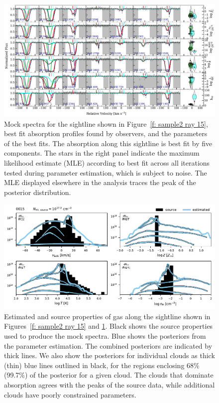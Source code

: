 \documentclass[fleqn,usenatbib]{mnras}
\begin{document}
\begin{figure}
    \centering
    \includegraphics[width=\textwidth]{figures/sample2/best_fits/0015.pdf}
    \caption{
    Mock spectra for the sightline shown in Figure~\ref{f: sample2 ray 15},
    best fit absorption profiles found by observers,
    and the parameters of the best fits.
    The absorption along this sightline is best fit by five components.
    The stars in the right panel indicate the maximum likelihood estimate (MLE) according to best fit across all iterations tested during parameter estimation,
    which is subject to noise.
    The MLE displayed elsewhere in the analysis traces the peak of the posterior distribution.
    }
    \label{f: sample2 spectrum 15}
    \end{figure}

\begin{figure}
    \centering
    \includegraphics[width=\textwidth]{figures/sample2/high-z/sightline_0015.pdf}
    \caption{
    Estimated and source properties of gas along the sightline shown in Figures~\ref{f: sample2 ray 15} and \ref{f: sample2 spectrum 15}.
    Black shows the source properties used to produce the mock spectra.
    Blue shows the posteriors from the parameter estimation. 
    The combined posteriors are indicated by thick lines.
    We also show the posteriors for individual clouds as thick (thin) blue lines outlined in black, for the regions enclosing 68\% (99.7\%) of the posterior for a given cloud.
    The clouds that dominate  absorption agrees with the peaks of the source data, while additional clouds have poorly constrained parameters.
    }
    \label{f: sample2 15}
\end{figure}
\end{document}
